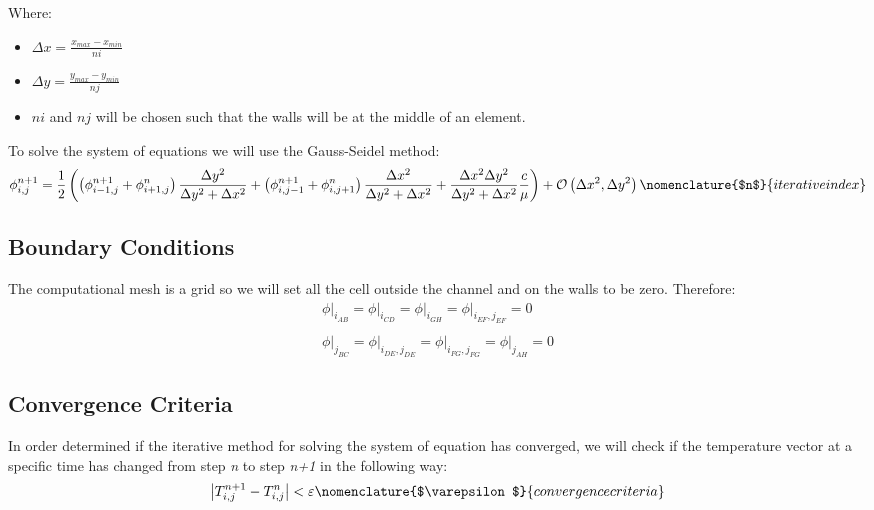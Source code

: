 \documentclass[11pt, a4paper]{article}
\begin{document}
Where:
\begin{itemize}
    \item $\displaystyle\Delta x=\frac{x_{max}-x_{min}}{ni}$
    \item $\displaystyle\Delta y=\frac{y_{max}-y_{min}}{nj}$
    \item $ni$ and $nj$ will be chosen such that the walls will be at the middle of an element.
\end{itemize}
To solve the system of equations we will use the Gauss-Seidel method:
\begin{equation}
    \displaystyle\phi_{i,j}^{n+1}=\frac{1}{2}\left(\left(\phi_{i-1,j}^{n+1}+\phi_{i+1,j}^n\right)\frac{\Delta y^2}{\Delta y^2+\Delta x^2}+\left(\phi_{i,j-1}^{n+1}+\phi_{i,j+1}^n\right)\frac{\Delta x^2}{\Delta y^2+\Delta x^2}+\frac{\Delta x^2\Delta y^2}{\Delta y^2+\Delta x^2}\frac{c}{\mu}\right)+\mathcal{O}\left(\Delta x^2,\Delta y^2\right)
    \nomenclature{$n$}{iterative index}
\end{equation}
\subsection{Boundary Conditions}
The computational mesh is a grid so we will set all the cell outside the channel and on the walls to be zero. Therefore:
\begin{equation}
    \begin{array}{c}
        \left.\phi\right|_{i_{AB}}=\left.\phi\right|_{i_{CD}}=\left.\phi\right|_{i_{GH}}=\left.\phi\right|_{i_{EF},j_{EF}}=0 \\\\
        \left.\phi\right|_{j_{BC}}=\left.\phi\right|_{i_{DE},j_{DE}}=\left.\phi\right|_{i_{FG},j_{FG}}=\left.\phi\right|_{j_{AH}}=0
    \end{array}
\end{equation} 
\subsection{Convergence Criteria}
In order determined if the iterative method for solving the system of equation has converged, we will check if the temperature vector at a specific time has changed from step \emph{n} to step \emph{n+1} in the following way:
\begin{equation}
    \left|T_{i,j}^{n+1}-T_{i,j}^n\right|<\varepsilon
    \nomenclature{$\varepsilon$}{convergence criteria}
\end{equation}
\end{document}
